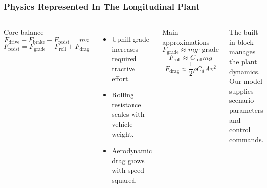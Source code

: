 \documentclass[aspectratio=169]{beamer}
\begin{document}
\begin{frame}
\frametitle{Physics Represented In The Longitudinal Plant}

\begin{columns}[T,totalwidth=\textwidth]
\begin{block}{Core balance}
\small
\[
F_{\mathrm{drive}} - F_{\mathrm{brake}} - F_{\mathrm{resist}} = m a
\]
\[
F_{\mathrm{resist}} =
F_{\mathrm{grade}} + F_{\mathrm{roll}} + F_{\mathrm{drag}}
\]
\end{block}

\vspace{0.15cm}
\begin{itemize}
    \item Uphill grade increases required tractive effort.
    \item Rolling resistance scales with vehicle weight.
    \item Aerodynamic drag grows with speed squared.
\end{itemize}

\begin{block}{Main approximations}
\small
\[
F_{\mathrm{grade}} \approx m g \cdot \mathrm{grade}
\]
\[
F_{\mathrm{roll}} \approx C_{\mathrm{roll}} m g
\]
\[
F_{\mathrm{drag}} \approx \frac{1}{2}\rho C_d A v^2
\]
\end{block}

\vspace{0.15cm}
\small
The built-in block manages the plant dynamics. Our model supplies scenario parameters and control commands.
\end{columns}

\end{frame}
\end{document}
